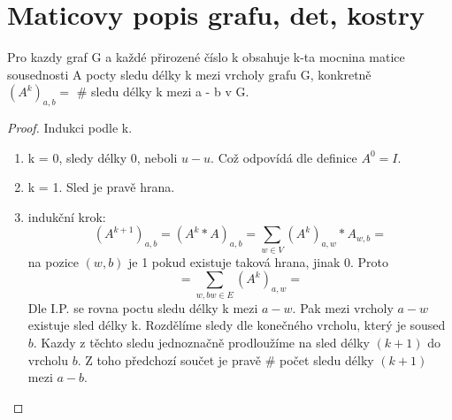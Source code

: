 \section{\texorpdfstring{Maticovy popis grafu, det, kostry}{Maticovy popis grafu, det, kostry}}
	\vspace{5mm}
\large


\begin{theorem}
Pro kazdy graf G a každé přirozené číslo k obsahuje k-ta mocnina matice sousednosti A pocty sledu délky k mezi vrcholy grafu G, konkretně\\
$(A^k)_{a,b} = $ \# sledu délky k mezi a - b v G.
\end{theorem}
\begin{proof}
Indukci podle k.
\begin{enumerate}
	\item k = 0, sledy délky 0, neboli $ u - u $. Což odpovídá dle definice $ A^0 = I $.
	\item k = 1. Sled je pravě hrana.
	\item indukční krok:
	\[(A^{k+1})_{a,b} = (A^k * A)_{a,b} = \sum_{w \in V} (A^k)_{a,w} * A_{w,b} = \]
	na pozice $ (w,b) $ je 1 pokud existuje taková hrana, jinak 0. Proto
	\[ = \sum_{w, bw \in E} (A^k)_{a,w} = \]
	Dle I.P. se rovna poctu sledu délky k mezi $a - w$.
	Pak mezi vrcholy $ a - w $ existuje sled délky k.
	Rozdělíme sledy dle konečného vrcholu, který je soused $b$.
	Kazdy z těchto sledu jednoznačně prodloužíme na sled délky $(k+1)$ do vrcholu $b$. Z toho předchozí součet je pravě \# počet sledu délky $(k+1)$ mezi $ a - b $.
\end{enumerate}
\end{proof}

